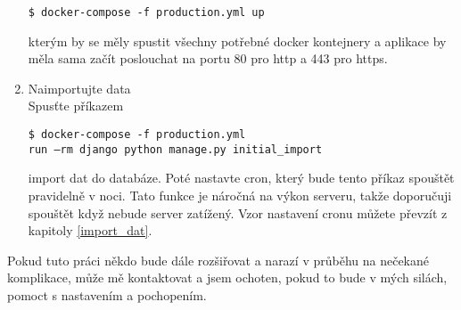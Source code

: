 \begin{enumerate}
\texttt{\$ docker-compose -f production.yml up}

kterým by se měly spustit všechny potřebné docker kontejnery a aplikace by měla sama začít poslouchat na portu 80 pro http a 443 pro https.

\item Naimportujte data\\
Spusťte příkazem 

\texttt{\$ docker-compose -f production.yml\\ 
        run --rm django python manage.py initial\_import }

import dat do databáze. Poté nastavte cron, který bude tento příkaz spouštět pravidelně v noci. Tato funkce je náročná na výkon serveru, takže doporučuji spouštět když nebude server zatížený. Vzor nastavení cronu můžete převzít z kapitoly \ref{import_dat}.
    
\end{enumerate}

Pokud tuto práci někdo bude dále rozšiřovat a narazí v průběhu na nečekané komplikace, může mě kontaktovat a jsem ochoten, pokud to bude v mých silách, pomoct s nastavením a pochopením.

